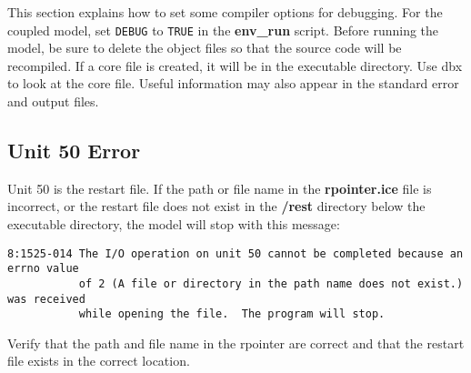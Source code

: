 This section explains how to set some compiler options for debugging. For
the coupled model, set {\tt DEBUG} to {\tt TRUE} in the {\bf env\_run} script.
Before running the model, be sure to delete the
object files so that the source code will be recompiled.  If a core file
is created, it will be in the executable directory.  Use dbx to look at
the core file. Useful information may also appear in the standard error
and output files.

\subsection{Unit 50 Error}

Unit 50 is the restart file.  If the path or file name in the {\bf rpointer.ice}
file is incorrect, or the restart file does not exist in the {\bf /rest} directory
below the executable directory, the model will stop with this message:

\begin{verbatim}
8:1525-014 The I/O operation on unit 50 cannot be completed because an errno value
           of 2 (A file or directory in the path name does not exist.) was received
           while opening the file.  The program will stop.
\end{verbatim}

Verify that the path and file name in the rpointer are correct and that the restart
file exists in the correct location.

